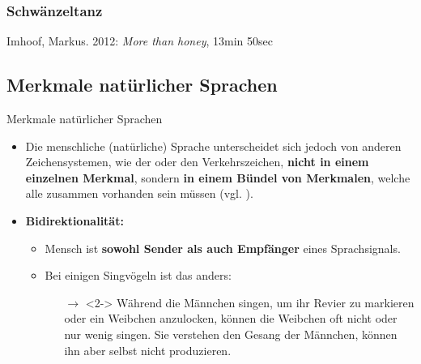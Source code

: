 \begin{frame}
\frametitle{Schwänzeltanz}

Imhoof, Markus. 2012: \emph{More than honey}, 13min 50sec



\end{frame}


%
\subsection{Merkmale natürlicher Sprachen}
	
\begin{frame}{Merkmale natürlicher Sprachen}

\begin{itemize}
	\item Die menschliche (natürliche) Sprache unterscheidet sich jedoch von anderen Zeichensystemen, wie der  oder den Verkehrszeichen, \textbf{nicht in einem einzelnen Merkmal}, sondern \textbf{in einem Bündel von Merkmalen}, welche alle zusammen vorhanden sein müssen (vgl. \citet{Hockett60a}).
\end{itemize}

\end{frame}




\begin{frame}

\begin{itemize}
	\item<1-> \bf{Bidirektionalität:}

	\begin{itemize}
		\item[]
		\item<1-> Mensch ist \textbf{sowohl Sender als auch Empfänger} eines Sprachsignals.
		\item[]
		\item<2-> Bei einigen Singvögeln ist das anders:
		
		\begin{itemize}
			\item[]
			\item[$\rightarrow$]<2-> Während die Männchen singen, um ihr Revier zu markieren oder ein Weibchen anzulocken, können die Weibchen oft nicht oder nur wenig singen. Sie verstehen den Gesang der Männchen, können ihn aber selbst nicht produzieren.
		\end{itemize}
			
	\end{itemize}

\end{itemize}

\end{frame}


